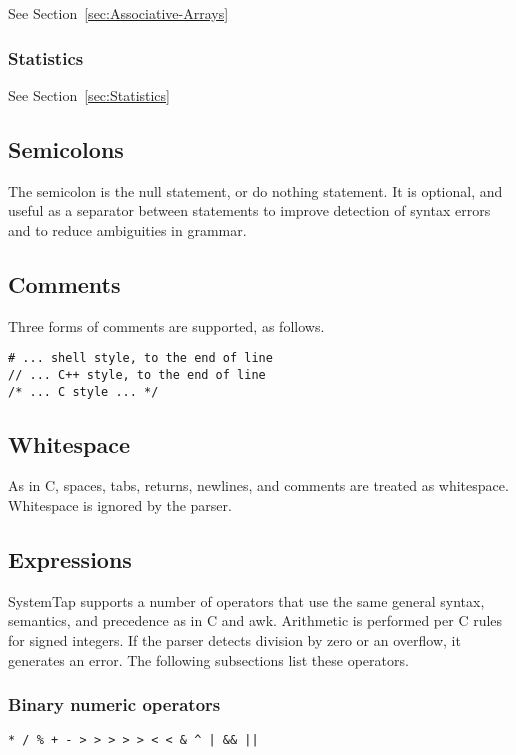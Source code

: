 \documentclass[twoside,english]{article}
\newenvironment{vindent}
{\begin{list}{}{\setlength{\listparindent}{6pt}}
\item[]}
{\end{list}}
\begin{document}
See Section~\ref{sec:Associative-Arrays}


\subsubsection{Statistics}

See Section~\ref{sec:Statistics}


\subsection{Semicolons}
\index{;}
The semicolon is the null statement, or do nothing statement. It is optional,
and useful as a separator between statements to improve detection of syntax
errors and to reduce ambiguities in grammar.


\subsection{Comments}
Three forms of comments are supported, as follows.

\begin{vindent}
\begin{verbatim}
# ... shell style, to the end of line
// ... C++ style, to the end of line
/* ... C style ... */
\end{verbatim}
\end{vindent}

\subsection{Whitespace}
As in C, spaces, tabs, returns, newlines, and comments are treated as whitespace.
Whitespace is ignored by the parser.


\subsection{Expressions}
SystemTap supports a number of operators that use the same general syntax,
semantics, and precedence as in C and awk. Arithmetic is performed per C
rules for signed integers. If the parser detects division by zero or an overflow,
it generates an error. The following subsections list these operators.

\subsubsection{Binary numeric operators}
\texttt{{*} / \% + - >\,{}> >\,{}>\,{}> <\,{}< \& \textasciicircum{}
| \&\& ||}
\end{document}
